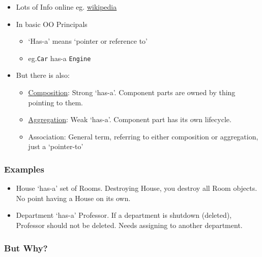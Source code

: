 \begin{itemize}
\itemsep1pt\parskip0pt
\item
  Lots of Info online eg.
  \href{https://en.wikipedia.org/wiki/Composition_over_inheritance}{wikipedia}
\item
  In basic OO Principals

  \begin{itemize}
  \itemsep1pt\parskip0pt
  \item
    `Has-a' means `pointer or reference to'
  \item
    eg.\texttt{Car} has-a \texttt{Engine}
  \end{itemize}
\item
  But there is also:

  \begin{itemize}
  \itemsep1pt\parskip0pt
  \item
    \href{https://en.wikipedia.org/wiki/Object_composition\#Composition}{Composition}:
    Strong `has-a'. Component parts are owned by thing pointing to them.
  \item
    \href{https://en.wikipedia.org/wiki/Object_composition\#Aggregation}{Aggregation}:
    Weak `has-a'. Component part has its own lifecycle.
  \item
    Association: General term, referring to either composition or
    aggregation, just a `pointer-to'
  \end{itemize}
\end{itemize}

\subsubsection{Examples}\label{examples-1}

\begin{itemize}
\itemsep1pt\parskip0pt
\item
  House `has-a' set of Rooms. Destroying House, you destroy all Room
  objects. No point having a House on its own.
\item
  Department `has-a' Professor. If a department is shutdown (deleted),
  Professor should not be deleted. Needs assigning to another
  department.
\end{itemize}

\subsubsection{But Why?}\label{but-why}

